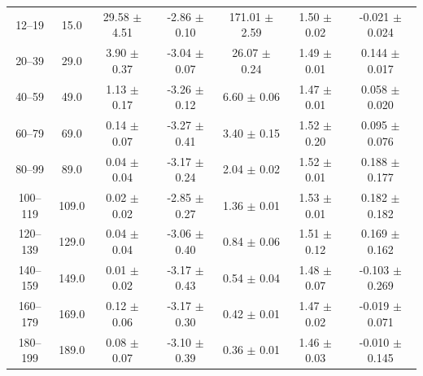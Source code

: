 \begin{table}[htbp]
\begin{tabular}{c c c c c c c}
12--19 & 15.0 & 29.58 $\pm$ 4.51 & -2.86 $\pm$ 0.10 & 171.01 $\pm$ 2.59 & 1.50 $\pm$ 0.02 & -0.021 $\pm$ 0.024 \\
20--39 & 29.0 & 3.90 $\pm$ 0.37 & -3.04 $\pm$ 0.07 & 26.07 $\pm$ 0.24 & 1.49 $\pm$ 0.01 & 0.144 $\pm$ 0.017 \\
40--59 & 49.0 & 1.13 $\pm$ 0.17 & -3.26 $\pm$ 0.12 & 6.60 $\pm$ 0.06 & 1.47 $\pm$ 0.01 & 0.058 $\pm$ 0.020 \\
60--79 & 69.0 & 0.14 $\pm$ 0.07 & -3.27 $\pm$ 0.41 & 3.40 $\pm$ 0.15 & 1.52 $\pm$ 0.20 & 0.095 $\pm$ 0.076 \\
80--99 & 89.0 & 0.04 $\pm$ 0.04 & -3.17 $\pm$ 0.24 & 2.04 $\pm$ 0.02 & 1.52 $\pm$ 0.01 & 0.188 $\pm$ 0.177 \\
100--119 & 109.0 & 0.02 $\pm$ 0.02 & -2.85 $\pm$ 0.27 & 1.36 $\pm$ 0.01 & 1.53 $\pm$ 0.01 & 0.182 $\pm$ 0.182 \\
120--139 & 129.0 & 0.04 $\pm$ 0.04 & -3.06 $\pm$ 0.40 & 0.84 $\pm$ 0.06 & 1.51 $\pm$ 0.12 & 0.169 $\pm$ 0.162 \\
140--159 & 149.0 & 0.01 $\pm$ 0.02 & -3.17 $\pm$ 0.43 & 0.54 $\pm$ 0.04 & 1.48 $\pm$ 0.07 & -0.103 $\pm$ 0.269 \\
160--179 & 169.0 & 0.12 $\pm$ 0.06 & -3.17 $\pm$ 0.30 & 0.42 $\pm$ 0.01 & 1.47 $\pm$ 0.02 & -0.019 $\pm$ 0.071 \\
180--199 & 189.0 & 0.08 $\pm$ 0.07 & -3.10 $\pm$ 0.39 & 0.36 $\pm$ 0.01 & 1.46 $\pm$ 0.03 & -0.010 $\pm$ 0.145 \\
\hline\hline
\end{tabular}
\end{table}
